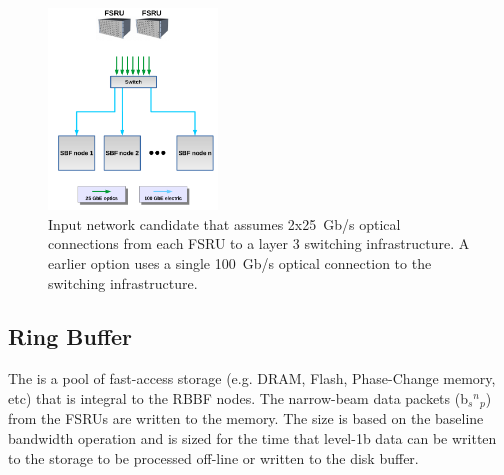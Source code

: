 \documentclass[12pt,a4paper]{article}
\begin{document}
\begin{figure}[ht]
\centering
\includegraphics[width=0.4\textwidth]{input_network_8.png}
\caption{Input network candidate that assumes 2x25~Gb/s optical connections from each FSRU to a layer 3 switching infrastructure. A earlier option uses a single 100~Gb/s optical connection to the switching infrastructure. \label{fig:network-layer}
}
\end{figure}




\subsection{Ring Buffer}
\label{ssec:ring-buffer}

The \RB is a pool of fast-access storage (e.g. DRAM, Flash, Phase-Change memory, etc) that is integral to the RBBF nodes. 
The narrow-beam data packets (b${_s} {^n} {_p}$) from the FSRUs are written to the \RB memory.
The \RB size is based on the baseline \NBW{} bandwidth operation and is sized for 
the time that level-1b data can be written to the storage to be processed off-line or written to the disk buffer. 
\end{document}
